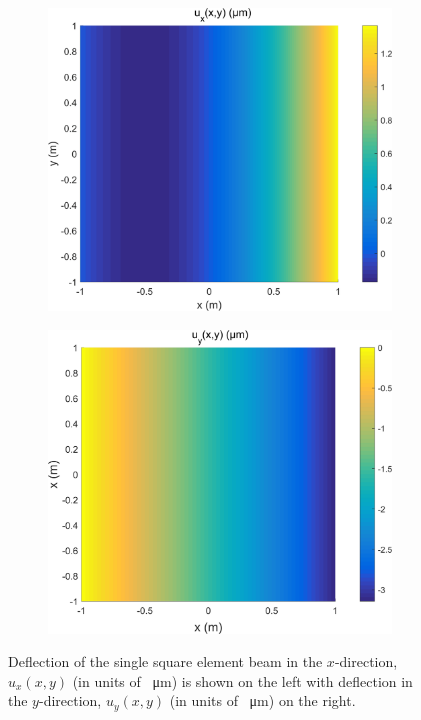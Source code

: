 \documentclass[11pt]{article}
\begin{document}
\begin{figure}[h!]
	\centering
	\begin{subfigure}{.5\textwidth}
		\centering
		\includegraphics[width=\linewidth]{q2a_surf_ux.png}
	\end{subfigure}%
	\begin{subfigure}{.5\textwidth}
		\centering
		\includegraphics[width=\linewidth]{q2a_surf_uy.png}
	\end{subfigure}
	\caption{Deflection of the single square element beam in the $x$-direction, $u_x(x,y)$ (in units of \SI{}{\micro\m}) is shown on the left with deflection in the $y$-direction, $u_y(x,y)$ (in units of \SI{}{\micro\m}) on the right.}
	\label{fig:q2a_ux_uy}
\end{figure}
\end{document}

